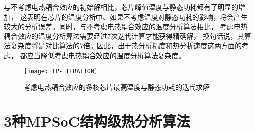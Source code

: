 与不考虑电热耦合效应的初始解相比，芯片峰值温度与静态功耗都有了明显的增加， 这表明在芯片的温度分析中、如果不考虑温度对静态功耗的影响，将会产生较大的分析误差。同时，与不考虑电热耦合效应的温度分析算法相比， 考虑电热耦合效应的温度分析算法需要经过7次迭代计算才能获得精确解， 换句话说，其算法复杂度将是对比算法的7倍。因此，出于热分析精度和热分析速度这两方面的考虑， 都应当降低考虑电热耦合效应的温度分析算法复杂度。
\begin{figure}[H]
  \centering
  \texttt{[image: TP-ITERATION]}
  \caption{考虑电热耦合效应的多核芯片最高温度与静态功耗的迭代求解}
  \label{fig:tp-iteration}
\end{figure}


\section{3种MPSoC结构级热分析算法}
\label{sec:SSTAmethod}

